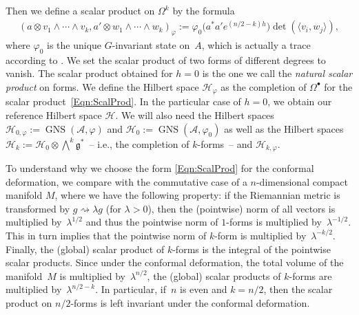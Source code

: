 \documentclass[pdftex]{sigma}
\newcommand{\Aa}{\mathcal{A}}
\newcommand{\Hh}{\mathscr{H}}
\newcommand{\LieG}{\mathfrak{g}}
\DeclareMathOperator{\GNS}{GNS}
\numberwithin{equation}{section}
\begin{document}
Then we def\/ine a scalar product on $\Omega^k$ by the formula
\begin{gather}
\label{Eqn:ScalProd}
(a \otimes v_1 \wedge \cdots \wedge v_k, a' \otimes w_1 \wedge \cdots \wedge w_k )_\varphi := \varphi_0\big( a^* a' e^{(n/2-k)h}\big) \det( \langle v_i, w_j \rangle ),
\end{gather}
where $\varphi_0$ is the unique $G$-invariant state on~$A$, which is actually a trace according to \cite[Theorem~3.1, p.~8]{ErgodActAHK}. We set the scalar product of two forms of dif\/ferent degrees to vanish. The scalar product obtained for $h = 0$ is the one we call the \emph{natural scalar product} on forms. We def\/ine the Hilbert space $\Hh_\varphi$ as the completion of $\Omega^\bullet$ for the scalar product~\eqref{Eqn:ScalProd}. In the particular case of $h = 0$, we obtain our reference Hilbert space $\Hh$. We will also need the Hilbert spaces $\Hh_{0, \varphi} := \GNS(\Aa, \varphi)$ and $\Hh_{0} := \GNS(\Aa, \varphi_0)$ as well as the Hilbert spaces $\Hh_k := \Hh_0 \otimes \bigwedge^k \LieG^*$~-- i.e., the completion of $k$-forms~-- and $\Hh_{k, \varphi}$.

To understand why we choose the form \eqref{Eqn:ScalProd} for the conformal deformation, we compare with the commutative case of a $n$-dimensional compact manifold $M$, where we have the following property: if the Riemannian metric is transformed by $g \rightsquigarrow \lambda g$ (for $\lambda > 0$), then the (pointwise) norm of all vectors is multiplied by~$\lambda^{1/2}$ and thus the pointwise norm of $1$-forms is multiplied by~$\lambda^{-1/2}$. This in turn implies that the pointwise norm of $k$-form is multiplied by~$\lambda^{-k/2}$. Finally, the (global) scalar product of $k$-forms is the integral of the pointwise scalar products. Since under the conformal deformation, the total volume of the manifold~$M$ is multiplied by~$\lambda^{n/2}$, the (global) scalar products of $k$-forms are multiplied by~$\lambda^{n/2-k}$. In particular, if~$n$ is even and $k = n/2$, then the scalar product on $n/2$-forms is left invariant under the conformal deformation.
\end{document}

